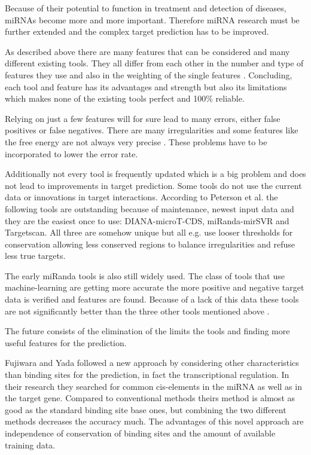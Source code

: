 \documentclass[12pt]{article}
\begin{document}
Because of their potential to function in treatment and detection of diseases, miRNAs become more and more important. Therefore miRNA research must be further extended and the complex target prediction has to be improved.



As described above there are many features that can be considered and many different existing tools. They all differ from each other in the number and type of features they use and also in the weighting of the single features \cite{Peterson}. Concluding, each tool and feature has its advantages and strength but also its limitations which makes none of the existing tools perfect and 100\% reliable. 

Relying on just a few features will for sure lead to many errors, either false positives or false negatives. There are many irregularities and some features like the free energy are not always very precise \cite{Peterson}. These problems have to be incorporated to lower the error rate.

Additionally not every tool is frequently updated which is a big problem and does not lead to improvements in target prediction. Some tools do not use the current data or innovations in target interactions. According to Peterson et al. \cite{Peterson} the following tools are outstanding because of maintenance, newest input data and they are the easiest once to use: DIANA-microT-CDS, miRanda-mirSVR and Targetscan. All three are somehow unique but all e.g. use looser thresholds for conservation allowing less conserved regions to balance irregularities and refuse less true targets.

The early miRanda tools is also still widely used. The class of tools that use machine-learning are getting more accurate the more positive and negative target data is verified and features are found. Because of a lack of this data these tools are not significantly better than the three other tools mentioned above \cite{Peterson}.

The future consists of the elimination of the limits the tools and finding more useful features for the prediction.

Fujiwara and Yada \cite{Fuji} followed a new approach by considering other characteristics than binding sites for the prediction, in fact the transcriptional regulation. In their research they searched for common cis-elements in the miRNA as well as in the target gene. Compared to conventional methods theirs method is almost as good as the standard binding site base ones, but combining the two different methods decreases the accuracy much. The advantages of this novel approach are independence of conservation of binding sites and the amount of available training data. 
\end{document}
